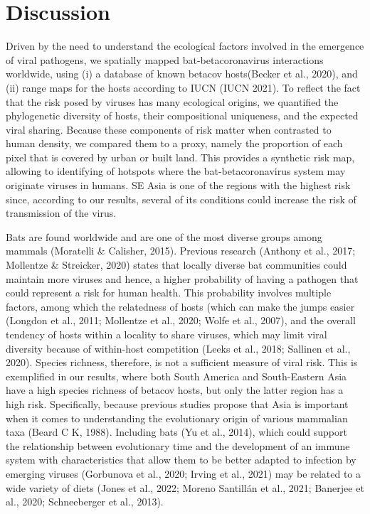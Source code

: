 \documentclass[11pt]{article}
\begin{document}
\hypertarget{discussion}{%
\section{Discussion}\label{discussion}}

Driven by the need to understand the ecological factors involved in the
emergence of viral pathogens, we spatially mapped bat-betacoronavirus
interactions worldwide, using (i) a database of known betacov
hosts(Becker et al., 2020), and (ii) range maps for the hosts according
to IUCN (IUCN 2021). To reflect the fact that the risk posed by viruses
has many ecological origins, we quantified the phylogenetic diversity of
hosts, their compositional uniqueness, and the expected viral sharing.
Because these components of risk matter when contrasted to human
density, we compared them to a proxy, namely the proportion of each
pixel that is covered by urban or built land. This provides a synthetic
risk map, allowing to identifying of hotspots where the
bat-betacoronavirus system may originate viruses in humans. SE Asia is
one of the regions with the highest risk since, according to our
results, several of its conditions could increase the risk of
transmission of the virus.

Bats are found worldwide and are one of the most diverse groups among
mammals (Moratelli \& Calisher, 2015). Previous research (Anthony et
al., 2017; Mollentze \& Streicker, 2020) states that locally diverse bat
communities could maintain more viruses and hence, a higher probability
of having a pathogen that could represent a risk for human health. This
probability involves multiple factors, among which the relatedness of
hosts (which can make the jumps easier (Longdon et al., 2011; Mollentze
et al., 2020; Wolfe et al., 2007), and the overall tendency of hosts
within a locality to share viruses, which may limit viral diversity
because of within-host competition (Leeks et al., 2018; Sallinen et al.,
2020). Species richness, therefore, is not a sufficient measure of viral
risk. This is exemplified in our results, where both South America and
South-Eastern Asia have a high species richness of betacov hosts, but
only the latter region has a high risk. Specifically, because previous
studies propose that Asia is important when it comes to understanding
the evolutionary origin of various mammalian taxa (Beard C K, 1988).
Including bats (Yu et al., 2014), which could support the relationship
between evolutionary time and the development of an immune system with
characteristics that allow them to be better adapted to infection by
emerging viruses (Gorbunova et al., 2020; Irving et al., 2021) may be
related to a wide variety of diets (Jones et al., 2022; Moreno Santillán
et al., 2021; Banerjee et al., 2020; Schneeberger et al., 2013).
\end{document}
